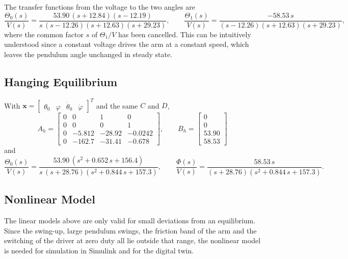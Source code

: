 \documentclass[a4paper,11pt]{article}
\begin{document}
The transfer functions from the voltage to the two angles are
\begin{equation}
  \frac{\Theta_0(s)}{V(s)} = \frac{53.90\,(s + 12.84)(s - 12.19)}{s\,(s - 12.26)(s + 12.63)(s + 29.23)}, \qquad
  \frac{\Theta_1(s)}{V(s)} = \frac{-58.53\, s}{(s - 12.26)(s + 12.63)(s + 29.23)} ,
  \label{eq:tf_up}
\end{equation}
where the common factor $s$ of $\Theta_1/V$ has been cancelled. This can be intuitively understood since a constant voltage drives the arm at a constant speed, which leaves the pendulum angle unchanged in steady state.

\subsection{Hanging Equilibrium}
With $\mathbf{x} = \begin{bmatrix} \theta_0 & \varphi & \dot\theta_0 & \dot\varphi \end{bmatrix}^T$ and the same $C$ and $D$,
\begin{equation}
\boxed{
  A_h = \begin{bmatrix}
  0 & 0 & 1 & 0\\
  0 & 0 & 0 & 1\\
  0 & -5.812 & -28.92 & -0.0242\\
  0 & -162.7 & -31.41 & -0.678
  \end{bmatrix}, \qquad
  B_h = \begin{bmatrix} 0 \\ 0 \\ 53.90 \\ 58.53 \end{bmatrix}
}
\label{eq:ss_hang_num}
\end{equation}
and
\begin{equation}
  \frac{\Theta_0(s)}{V(s)} = \frac{53.90\,(s^2 + 0.652\, s + 156.4)}{s\,(s + 28.76)(s^2 + 0.844\, s + 157.3)}, \qquad
  \frac{\Phi(s)}{V(s)} = \frac{58.53\, s}{(s + 28.76)(s^2 + 0.844\, s + 157.3)} .
  \label{eq:tf_hang}
\end{equation}

\subsection{Nonlinear Model}
\label{sec:nlmodel}
The linear models above are only valid for small deviations from an equilibrium. Since the swing-up, large pendulum swings, the friction band of the arm and the switching of the driver at zero duty all lie outside that range, the nonlinear model is needed for simulation in Simulink and for the digital twin.
\end{document}
